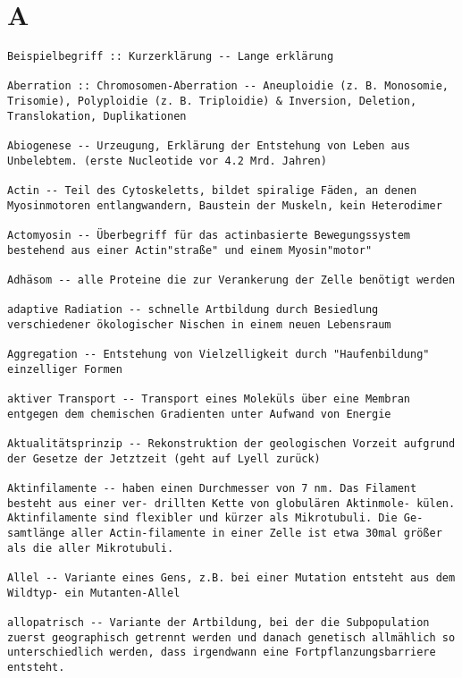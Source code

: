 \documentclass{article}
\begin{document}
\vspace{-1mm}

\section{A}
\begin{verbatim}
Beispielbegriff :: Kurzerklärung -- Lange erklärung 

Aberration :: Chromosomen-Aberration -- Aneuploidie (z. B. Monosomie, Trisomie), Polyploidie (z. B. Triploidie) & Inversion, Deletion, Translokation, Duplikationen

Abiogenese -- Urzeugung, Erklärung der Entstehung von Leben aus Unbelebtem. (erste Nucleotide vor 4.2 Mrd. Jahren)

Actin -- Teil des Cytoskeletts, bildet spiralige Fäden, an denen Myosinmotoren entlangwandern, Baustein der Muskeln, kein Heterodimer

Actomyosin -- Überbegriff für das actinbasierte Bewegungssystem bestehend aus einer Actin"straße" und einem Myosin"motor"

Adhäsom -- alle Proteine die zur Verankerung der Zelle benötigt werden

adaptive Radiation -- schnelle Artbildung durch Besiedlung verschiedener ökologischer Nischen in einem neuen Lebensraum

Aggregation -- Entstehung von Vielzelligkeit durch "Haufenbildung" einzelliger Formen

aktiver Transport -- Transport eines Moleküls über eine Membran entgegen dem chemischen Gradienten unter Aufwand von Energie

Aktualitätsprinzip -- Rekonstruktion der geologischen Vorzeit aufgrund der Gesetze der Jetztzeit (geht auf Lyell zurück)

Aktinfilamente -- haben einen Durchmesser von 7 nm. Das Filament besteht aus einer ver- drillten Kette von globulären Aktinmole- külen. Aktinfilamente sind flexibler und kürzer als Mikrotubuli. Die Ge- samtlänge aller Actin-filamente in einer Zelle ist etwa 30mal größer als die aller Mikrotubuli.

Allel -- Variante eines Gens, z.B. bei einer Mutation entsteht aus dem Wildtyp- ein Mutanten-Allel

allopatrisch -- Variante der Artbildung, bei der die Subpopulation zuerst geographisch getrennt werden und danach genetisch allmählich so unterschiedlich werden, dass irgendwann eine Fortpflanzungsbarriere entsteht.


\end{verbatim}
\end{document}
